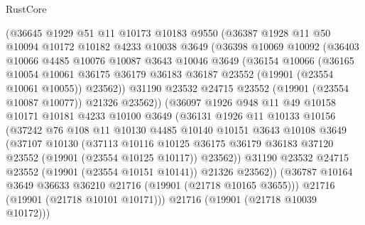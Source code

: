 \begin{lexlean}{RustCore}
\begin{coremodule}
          (@36645
            @1929
            @51
            @11
            @10173
            @10183
            @9550
            (@36387
              @1928
              @11
              @50
              @10094
              @10172
              @10182
              @4233
              @10038
              @3649
              (@36398
                @10069
                @10092
                (@36403
                  @10066
                  @4485
                  @10076
                  @10087
                  @3643
                  @10046
                  @3649
                  (@36154
                    @10066
                    (@36165
                      @10054
                      @10061
                      @36175
                      @36179
                      @36183
                      @36187
                      @23552
                      (@19901 (@23554 @10061 @10055))
                      @23562))
                  @31190
                  @23532
                  @24715
                  @23552
                  (@19901 (@23554 @10087 @10077))
                  @21326
                  @23562))
              (@36097
                @1926
                @948
                @11
                @49
                @10158
                @10171
                @10181
                @4233
                @10100
                @3649
                (@36131
                  @1926
                  @11
                  @10133
                  @10156
                  (@37242
                    @76
                    @108
                    @11
                    @10130
                    @4485
                    @10140
                    @10151
                    @3643
                    @10108
                    @3649
                    (@37107
                      @10130
                      (@37113
                        @10116
                        @10125
                        @36175
                        @36179
                        @36183
                        @37120
                        @23552
                        (@19901 (@23554 @10125 @10117))
                        @23562))
                    @31190
                    @23532
                    @24715
                    @23552
                    (@19901 (@23554 @10151 @10141))
                    @21326
                    @23562))
                (@36787 @10164 @3649 @36633 @36210 @21716 (@19901 (@21718 @10165 @3655)))
                @21716
                (@19901 (@21718 @10101 @10171)))
              @21716
              (@19901 (@21718 @10039 @10172)))

\end{coremodule}
\end{lexlean}
